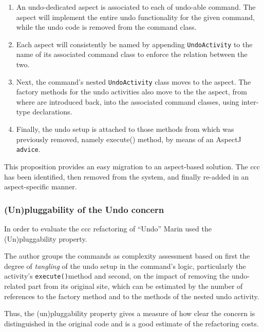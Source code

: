 \begin{enumerate}

	\item An undo-dedicated aspect is associated to each of undo-able command. 
	The aspect will implement the entire undo functionality for the given command, while the undo code is removed from the command class.

 	\item Each aspect will consistently be named by appending \texttt{UndoActivity} to the name of its associated command class to enforce the relation between the two.

	\item Next, the command's nested \texttt{UndoActivity} class moves to the aspect. 
	The factory methods for the undo activities also move to the the aspect, from where are introduced back, into the associated command classes, using inter-type declarations.

	\item Finally, the undo setup is attached to those methods from which was previously removed, namely execute() method, by means of an AspectJ \texttt{advice}.

\end{enumerate}

This proposition \cite{marin2004refactoring} provides an easy migration to an aspect-based solution. 
The \ac{ccc} has been identified, then removed from the system, and finally re-added in an aspect-specific manner.

\subsubsection{(Un)pluggability of the Undo concern}
In order to evaluate the \ac{ccc} refactoring of ``Undo'' Marin \cite{marin2004refactoring} used the (Un)pluggability property.

The author groups the commands as complexity assessment based on first the degree of \textit{tangling} of the undo setup in the command's logic, particularly the activity's \texttt{execute()}method and second, on the impact of removing the undo-related part from its original site, which can be estimated by the number of references to the factory method and to the methods of the nested undo activity.

Thus, the (un)pluggability property gives a measure of how clear the concern is distinguished in the original code and is a good estimate of the refactoring costs.

